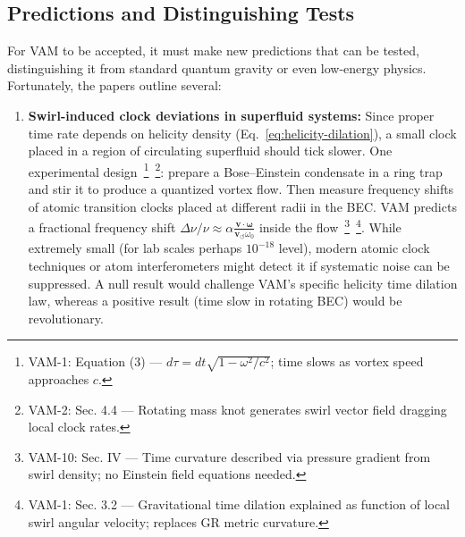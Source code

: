 \documentclass[a4paper,12pt]{article}
\begin{document}
    \subsection{Predictions and Distinguishing Tests}
    For VAM to be accepted, it must make new predictions that can be tested, distinguishing it from standard quantum gravity or even low-energy physics. Fortunately, the papers outline several:

    \begin{enumerate}
        \item \textbf{Swirl-induced clock deviations in superfluid systems:}
        Since proper time rate depends on helicity density (Eq.~\ref{eq:helicity-dilation}), a small clock placed in a region of circulating superfluid should tick slower. One experimental design~\footnote{VAM-1: Equation (3) — $d\tau = dt \sqrt{1 - \omega^2/c^2}$; time slows as vortex speed approaches $c$.}~\footnote{VAM-2: Sec. 4.4 — Rotating mass knot generates swirl vector field dragging local clock rates.}: prepare a Bose–Einstein condensate in a ring trap and stir it to produce a quantized vortex flow. Then measure frequency shifts of atomic transition clocks placed at different radii in the BEC. VAM predicts a fractional frequency shift $\Delta \nu/\nu \approx \alpha \frac{\mathbf{v}\cdot\boldsymbol{\omega}}{\mathbf{v}_{\scriptscriptstyle\boldsymbol{\circlearrowleft}} \omega_0}$ inside the flow~\footnote{VAM-10: Sec. IV — Time curvature described via pressure gradient from swirl density; no Einstein field equations needed.}~\footnote{VAM-1: Sec. 3.2 — Gravitational time dilation explained as function of local swirl angular velocity; replaces GR metric curvature.}. While extremely small (for lab scales perhaps $10^{-18}$ level), modern atomic clock techniques or atom interferometers might detect it if systematic noise can be suppressed. A null result would challenge VAM’s specific helicity time dilation law, whereas a positive result (time slow in rotating BEC) would be revolutionary.


\end{enumerate}
\end{document}
